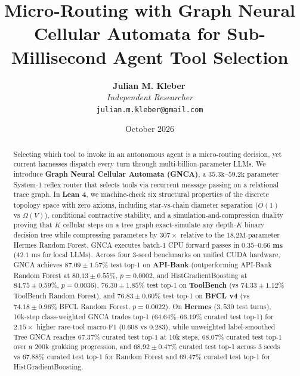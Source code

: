 \documentclass[10pt,twocolumn,letterpaper]{article}
\title{\textbf{Micro-Routing with Graph Neural Cellular Automata for Sub-Millisecond Agent Tool Selection}}
\author{%
  \textbf{Julian M. Kleber}\,\orcidlink{0000-0001-5518-0932} \\
  \textit{Independent Researcher} \\
  \texttt{julian.m.kleber@gmail.com}
}
\date{October 2026}
\begin{document}
\maketitle

\begin{abstract}
Selecting which tool to invoke in an autonomous agent is a micro-routing decision, yet current harnesses dispatch every turn through multi-billion-parameter LLMs. We introduce \textbf{Graph Neural Cellular Automata (GNCA)}, a $35.3\text{k}$--$59.2\text{k}$ parameter System-1 reflex router that selects tools via recurrent message passing on a relational trace graph. In \textbf{Lean 4}, we machine-check six structural properties of the discrete topology space with zero axioms, including star-vs-chain diameter separation ($O(1)$ vs $\Omega(V)$), conditional contractive stability, and a simulation-and-compression duality proving that $K$ cellular steps on a tree graph exact-simulate any depth-$K$ binary decision tree while compressing parameters by $307\times$ relative to the $18.2\text{M}$-parameter Hermes Random Forest. GNCA executes batch-1 CPU forward passes in $\mathbf{0.35}$--$\mathbf{0.66\text{ ms}}$ ($42.1\text{ ms}$ for local LLMs). Across four 3-seed benchmarks on unified CUDA hardware, GNCA achieves $\mathbf{87.09 \pm 1.57\%}$ test top-1 on \textbf{API-Bank} (outperforming API-Bank Random Forest at $80.13 \pm 0.55\%$, $p = 0.0002$, and HistGradientBoosting at $84.75 \pm 0.59\%$, $p = 0.0036$), $\mathbf{76.30 \pm 1.85\%}$ test top-1 on \textbf{ToolBench} (vs $74.33 \pm 1.12\%$ ToolBench Random Forest), and $\mathbf{76.83 \pm 0.60\%}$ test top-1 on \textbf{BFCL v4} (vs $74.18 \pm 0.96\%$ BFCL Random Forest, $p = 0.0022$). On \textbf{Hermes} ($3{,}530$ test turns), 10k-step class-weighted GNCA trades top-1 ($64.64\%$--$66.19\%$ curated test top-1) for $2.15\times$ higher rare-tool macro-F1 ($0.608$ vs $0.283$), while unweighted label-smoothed Tree GNCA reaches $67.37\%$ curated test top-1 at 10k steps, $68.07\%$ curated test top-1 over a 200k grokking progression, and $\mathbf{68.92 \pm 0.47\%}$ curated test top-1 across 3 seeds vs $67.88\%$ curated test top-1 for Random Forest and $69.47\%$ curated test top-1 for HistGradientBoosting.
\end{abstract}
\end{document}
